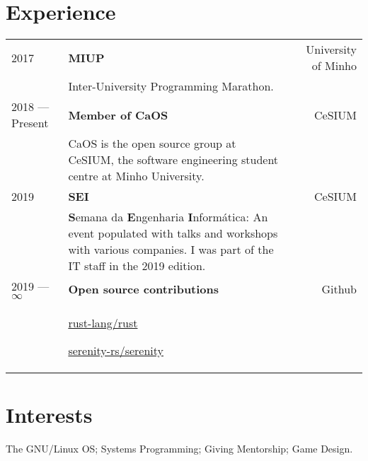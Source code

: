 \documentclass{article}
\begin{document}
\begin{textblock}{7.3}
    \section{Experience}
    \begin{tabular}{lp{8.4cm}r}
        2017 & \textbf{MIUP} & University of Minho\\
        & Inter-University Programming Marathon. &\\
        2018 --- Present & \textbf{Member of CaOS} & CeSIUM\\
        & CaOS is the open source group at CeSIUM, the software engineering
        student centre at Minho University. &\\
        2019 & \textbf{SEI} & CeSIUM \\
        & \textbf{S}emana da \textbf{E}ngenharia \textbf{I}nformática: An event
        populated with talks and workshops with various companies. I was part of
        the IT staff in the 2019 edition. &\\
        2019 --- $\infty$ & \textbf{Open source contributions} & Github\\
        & \href{https://github.com/rust-lang/rust/pulls?q=author\%3Amendess+}
                {rust-lang/rust}

          \href{https://github.com/serenity-rs/serenity/pulls?q=author\%3Amendess+}
                {serenity-rs/serenity} &
    \end{tabular}

    \section{Interests}
    The GNU/Linux OS\@; Systems Programming\@; Giving Mentorship\@; Game Design.

\end{textblock}
\end{document}
